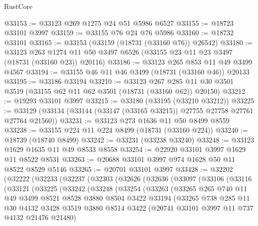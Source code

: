 \begin{lexlean}{RustCore}
\begin{coremodule}
@33153 := @33123 @269 @1275 @24 @51 @5986 @6527
@33155 := @18723 @33101 @3997
@33159 := @33155 @76 @24 @76 @5986
@33160 := @18732 @33101
@33165 := @33153 (@33159 (@18731 (@33160 @76)) @26542)
@33180 := @33123
    @263
    @1274
    @11
    @50
    @3497
    @6526
    (@33155 @23 @11 @23 @3497 (@18731 (@33160 @23)) @20116)
@33186 := @33123 @265 @853 @11 @49 @3499 @4567
@33194 := @33155 @46 @11 @46 @3499 (@18731 (@33160 @46)) @20133
@33195 := @33186 @33194
@33210 := @33123
    @267
    @285
    @11
    @30
    @3501
    @3519
    (@33155 @62 @11 @62 @3501 (@18731 (@33160 @62)) @20150)
@33212 := @19293 @33101 @3997
@33215 := @33180 (@33195 (@33210 @33212))
@33225 := @33129 (@33134 (@33144 (@33147 (@33165 @33215)) @27755 @27758 @27761 @27764 @21560))
@33231 := @33123 @273 @1636 @11 @50 @8499 @8559
@33238 := @33155 @224 @11 @224 @8499 (@18731 (@33160 @224))
@33240 := @18739 (@18740 @8499)
@33242 := @33231 (@33238 @33240)
@33248 := @33123 @1629 @1635 @11 @49 @8533 @8558
@33254 := @22920 @33101 @3997 @1629 @11 @8522 @8531
@33263 := @20688 @33101 @3997 @974 @1628 @50 @11 @8522 @8529 @5146
@33265 := @20701 @33101 @3997
@33428 := @32202
    (@32222
      (@32233
        (@32237
          (@32303
            (@32626
              (@32636
                (@33097
                  (@33106
                    (@33116
                      (@33121
                        (@33225
                          (@33242
                            (@33248
                              (@33254
                                (@33263
                                  (@33265
                                    @265
                                    @740
                                    @11
                                    @49
                                    @3499
                                    @8521
                                    @8528
                                    @3880
                                    @8504
                                    @3422
                                    @33194
                                    (@33265
                                      @738
                                      @285
                                      @11
                                      @30
                                      @4132
                                      @3428
                                      @3519
                                      @3880
                                      @8514
                                      @3422
                                      (@20741 @33101 @3997 @11 @737 @4132 @21476 @21480)

\end{coremodule}
\end{lexlean}
